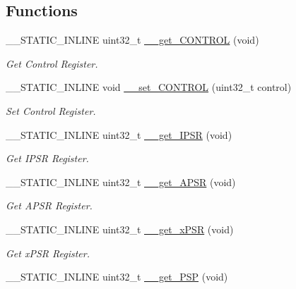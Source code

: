 \subsection*{Functions}
\begin{DoxyCompactItemize}
\item 
\+\_\+\+\_\+\+S\+T\+A\+T\+I\+C\+\_\+\+I\+N\+L\+I\+NE uint32\+\_\+t \hyperlink{group___c_m_s_i_s___core___reg_acc_functions_ga5fe64567d5bf0a81c118374e9a3a4598}{\+\_\+\+\_\+get\+\_\+\+C\+O\+N\+T\+R\+OL} (void)
\begin{DoxyCompactList}\small\item\em Get Control Register. \end{DoxyCompactList}\item 
\+\_\+\+\_\+\+S\+T\+A\+T\+I\+C\+\_\+\+I\+N\+L\+I\+NE void \hyperlink{group___c_m_s_i_s___core___reg_acc_functions_ga558df7eeb0a34765e0b54d9853d08484}{\+\_\+\+\_\+set\+\_\+\+C\+O\+N\+T\+R\+OL} (uint32\+\_\+t control)
\begin{DoxyCompactList}\small\item\em Set Control Register. \end{DoxyCompactList}\item 
\+\_\+\+\_\+\+S\+T\+A\+T\+I\+C\+\_\+\+I\+N\+L\+I\+NE uint32\+\_\+t \hyperlink{group___c_m_s_i_s___core___reg_acc_functions_ga2c18685a915eb9b7513a907c2b866636}{\+\_\+\+\_\+get\+\_\+\+I\+P\+SR} (void)
\begin{DoxyCompactList}\small\item\em Get I\+P\+SR Register. \end{DoxyCompactList}\item 
\+\_\+\+\_\+\+S\+T\+A\+T\+I\+C\+\_\+\+I\+N\+L\+I\+NE uint32\+\_\+t \hyperlink{group___c_m_s_i_s___core___reg_acc_functions_gaf082254959c727c663f2334021f1a98a}{\+\_\+\+\_\+get\+\_\+\+A\+P\+SR} (void)
\begin{DoxyCompactList}\small\item\em Get A\+P\+SR Register. \end{DoxyCompactList}\item 
\+\_\+\+\_\+\+S\+T\+A\+T\+I\+C\+\_\+\+I\+N\+L\+I\+NE uint32\+\_\+t \hyperlink{group___c_m_s_i_s___core___reg_acc_functions_ga94c675a736d4754a5f73d8748b24aa11}{\+\_\+\+\_\+get\+\_\+x\+P\+SR} (void)
\begin{DoxyCompactList}\small\item\em Get x\+P\+SR Register. \end{DoxyCompactList}\item 
\+\_\+\+\_\+\+S\+T\+A\+T\+I\+C\+\_\+\+I\+N\+L\+I\+NE uint32\+\_\+t \hyperlink{group___c_m_s_i_s___core___reg_acc_functions_ga0c569cbb49336f8d638686f9103047aa}{\+\_\+\+\_\+get\+\_\+\+P\+SP} (void)

\end{DoxyCompactItemize}
